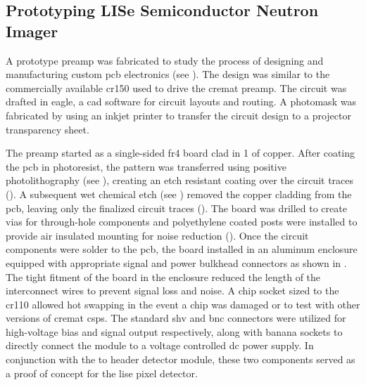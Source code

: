 \documentclass[../../../main.tex]{subfiles}%
\begin{document}
%
    \subsection{Prototyping LISe Semiconductor Neutron Imager}%
    \label{sec:chapter-3:early-designs:prototyping}%
    A prototype \gls{preamp} was fabricated to study the process of designing and manufacturing custom \gls{pcb} electronics (see ).
    The design was similar to the commercially available \gls{cr150} used to drive the \gls{cremat} \gls{preamp}.
    The circuit was drafted in \gls{eagle}, a \gls{cad} software for circuit layouts and routing. 
    A photomask was fabricated by using an inkjet printer to transfer the circuit design to a projector transparency sheet.
    \par%
    The \gls{preamp} started as a single-sided \gls{fr4} board clad in \SI{1}{\ounce} of copper.
    After coating the \gls{pcb} in photoresist, the pattern was transferred using positive photolithography (see ), creating an etch resistant coating over the circuit traces ().
    A subsequent wet chemical etch (see ) removed the copper cladding from the \gls{pcb}, leaving only the finalized circuit traces (). 
    The board was drilled to create vias for through-hole components and polyethylene coated posts were installed to provide air insulated mounting for noise reduction ().
    Once the circuit components were solder to the \gls{pcb}, the board installed in an aluminum enclosure equipped with appropriate signal and power bulkhead connectors as shown in .
    The tight fitment of the board in the enclosure reduced the length of the interconnect wires to prevent signal loss and noise.
    A chip socket sized to the \gls{cr110} allowed hot swapping in the event a chip was damaged or to test with other versions of \gls{cremat} \glspl{csp}.
    The standard \gls{shv} and \gls{bnc} connectors were utilized for \gls{high-voltage} bias and signal output respectively, along with banana sockets to directly connect the module to a voltage controlled \gls{dc} power supply. 
    In conjunction with the \gls{to} header detector module, these two components served as a proof of concept for the \gls{lise} pixel detector.
\end{document}
